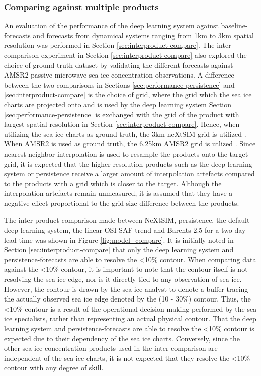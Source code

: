 \documentclass[../main/thesis]{subfiles}
\begin{document}
\subsubsection{Comparing against multiple products}
An evaluation of the performance of the deep learning system against baseline-forecasts and forecasts from dynamical systems ranging from 1km to 3km spatial resolution was performed in Section \ref{sec:interproduct-compare}. The inter-comparison experiment in Section \ref{sec:interproduct-compare} also explored the choice of ground-truth dataset by validating the different forecasts against AMSR2 passive microwave sea ice concentration observations. A difference between the two comparisons in Sections \ref{sec:performance-persistence} and \ref{sec:interproduct-compare} is the choice of grid, where the grid which the sea ice charts are projected onto and is used by the deep learning system Section \ref{sec:performance-persistence} is exchanged with the grid of the product with largest spatial resolution in Section \ref{sec:interproduct-compare}. Hence, when utilizing the sea ice charts as ground truth, the 3km neXtSIM grid is utilized \citep{Williams2021}. When AMSR2 is used as ground truth, the 6.25km AMSR2 grid is utlized \citep{Spreen2008}. Since nearest neighbor interpolation is used to resample the products onto the target grid, it is expected that the higher resolution products such as the deep learning system or persistence receive a larger amount of interpolation artefacts compared to the products with a grid which is closer to the target. Although the interpolation artefacts remain unmeasured, it is assumed that they have a negative effect proportional to the grid size difference between the products.

The inter-product comparison made between NeXtSIM, persistence, the default deep learning system, the linear OSI SAF trend and Barents-2.5 for a two day lead time was shown in Figure \ref{fig:model_compare}. It is initially noted in Section \ref{sec:interproduct-compare} that only the deep learning system and persistence-forecasts are able to resolve the <10\% contour. When comparing data against the <10\% contour, it is important to note that the contour itself is not resolving the sea ice edge, nor is it directly tied to any observation of sea ice. However, the contour is drawn by the sea ice analyst to denote a buffer tracing the actually observed sea ice edge denoted by the (10 - 30\%) contour. Thus, the <10\% contour is a result of the operational decision making performed by the sea ice specialists, rather than representing an actual physical contour. That the deep learning system and persistence-forecasts are able to resolve the <10\% contour is expected due to their dependency of the sea ice charts. Conversely, since the other sea ice concentration products used in the inter-comparison are independent of the sea ice charts, it is not expected that they resolve the <10\% contour with any degree of skill.
\end{document}
